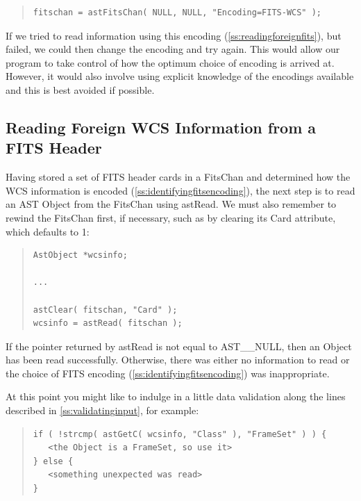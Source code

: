\documentclass[twoside,11pt]{article}
\newcommand{\htmlref}[2]{#1}
\newcommand{\secref}[1]{\S\ref{#1}}
\renewcommand{\secref}[1]{\ref{#1}}
\begin{document}
\begin{quote}
\small
\begin{verbatim}
fitschan = astFitsChan( NULL, NULL, "Encoding=FITS-WCS" );
\end{verbatim}
\normalsize
\end{quote}

If we tried to read information using this encoding
(\secref{ss:readingforeignfits}), but failed, we could then change the
encoding and try again.  This would allow our program to take control
of how the optimum choice of encoding is arrived at. However, it would
also involve using explicit knowledge of the encodings available and
this is best avoided if possible.

\subsection{\label{ss:readingforeignfits}Reading Foreign WCS Information from a FITS Header}

Having stored a set of FITS header cards in a \htmlref{FitsChan}{FitsChan} and determined
how the WCS information is encoded
(\secref{ss:identifyingfitsencoding}), the next step is to read an AST
\htmlref{Object}{Object} from the FitsChan using \htmlref{astRead}{astRead}. We must also remember to
rewind the FitsChan first, if necessary, such as by clearing its \htmlref{Card}{Card}
attribute, which defaults to 1:

\begin{quote}
\small
\begin{verbatim}
AstObject *wcsinfo;

...

astClear( fitschan, "Card" );
wcsinfo = astRead( fitschan );
\end{verbatim}
\normalsize
\end{quote}

If the pointer returned by astRead is not equal to AST\_\_NULL, then
an Object has been read successfully. Otherwise, there was either no
information to read or the choice of FITS encoding
(\secref{ss:identifyingfitsencoding}) was inappropriate.

At this point you might like to indulge in a little data validation
along the lines described in \secref{ss:validatinginput}, for example:

\begin{quote}
\small
\begin{verbatim}
if ( !strcmp( astGetC( wcsinfo, "Class" ), "FrameSet" ) ) {
   <the Object is a FrameSet, so use it>
} else {
   <something unexpected was read>
}
\end{verbatim}
\normalsize
\end{quote}
\end{document}
